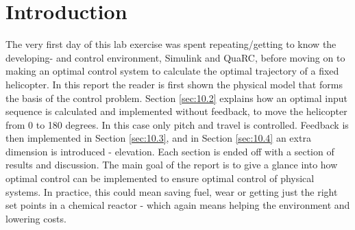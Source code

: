 \section{Introduction}\label{sec:intro}
The very first day of this lab exercise was spent repeating/getting to know the developing- and control environment, Simulink and QuaRC, before moving on to making an optimal control system to calculate the optimal trajectory of a fixed helicopter. In this report the reader is first shown the physical model that forms the basis of the control problem. Section \ref{sec:10.2} explains how an optimal input sequence is calculated and implemented without feedback, to move the helicopter from 0 to 180 degrees. In this case only pitch and travel is controlled. Feedback is then implemented in Section \ref{sec:10.3}, and in Section \ref{sec:10.4} an extra dimension is introduced - elevation. Each section is ended off with a section of results and discussion. The main goal of the report is to give a glance into how optimal control can be implemented to ensure optimal control of physical systems. In practice, this could mean saving fuel, wear or getting just the right set points in a chemical reactor - which again means helping the environment and lowering costs. 











